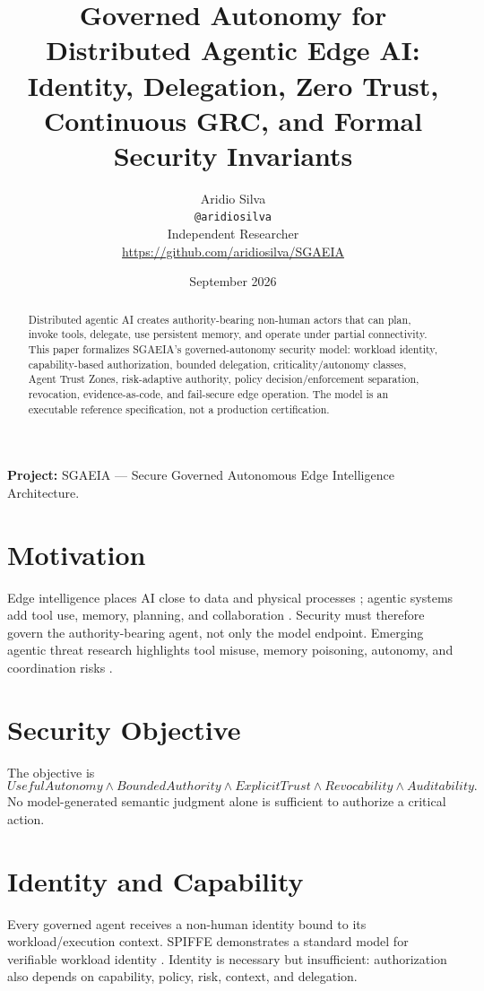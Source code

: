 \documentclass[11pt]{article}
\author{Aridio Silva\\\texttt{@aridiosilva}\\Independent Researcher\\\url{https://github.com/aridiosilva/SGAEIA}}
\date{September 2026}
\title{Governed Autonomy for Distributed Agentic Edge AI: Identity, Delegation, Zero Trust, Continuous GRC, and Formal Security Invariants}
\begin{document}
\maketitle
\begin{abstract}
Distributed agentic AI creates authority-bearing non-human actors that can plan, invoke tools, delegate, use persistent memory, and operate under partial connectivity. This paper formalizes SGAEIA's governed-autonomy security model: workload identity, capability-based authorization, bounded delegation, criticality/autonomy classes, Agent Trust Zones, risk-adaptive authority, policy decision/enforcement separation, revocation, evidence-as-code, and fail-secure edge operation. The model is an executable reference specification, not a production certification.
\end{abstract}
\noindent\textbf{Project:} SGAEIA --- Secure Governed Autonomous Edge Intelligence Architecture.\\

\section{Motivation}
Edge intelligence places AI close to data and physical processes \cite{zhou2019edge}; agentic systems add tool use, memory, planning, and collaboration \cite{tran2025}. Security must therefore govern the authority-bearing agent, not only the model endpoint. Emerging agentic threat research highlights tool misuse, memory poisoning, autonomy, and coordination risks \cite{datta2025,owasp,mitreatlas}.

\section{Security Objective}
The objective is
\[
UsefulAutonomy\land BoundedAuthority\land ExplicitTrust\land Revocability\land Auditability.
\]
No model-generated semantic judgment alone is sufficient to authorize a critical action.

\section{Identity and Capability}
Every governed agent receives a non-human identity bound to its workload/execution context. SPIFFE demonstrates a standard model for verifiable workload identity \cite{spiffe}. Identity is necessary but insufficient: authorization also depends on capability, policy, risk, context, and delegation.
\end{document}
